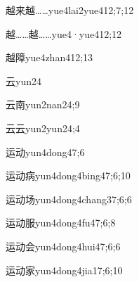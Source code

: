 \begin{verbete}{越来越……}{yue4lai2yue4}{12;7;12}
\end{verbete}

\begin{verbete}{越……越……}{yue4·yue4}{12;12}
\end{verbete}

\begin{verbete}{越障}{yue4zhan4}{12;13}
\end{verbete}

\begin{verbete}{云}{yun2}{4}
\end{verbete}

\begin{verbete}{云南}{yun2nan2}{4;9}
\end{verbete}

\begin{verbete}{云云}{yun2yun2}{4;4}
\end{verbete}

\begin{verbete}{运动}{yun4dong4}{7;6}
\end{verbete}

\begin{verbete}{运动病}{yun4dong4bing4}{7;6;10}
\end{verbete}

\begin{verbete}{运动场}{yun4dong4chang3}{7;6;6}
\end{verbete}

\begin{verbete}{运动服}{yun4dong4fu4}{7;6;8}
\end{verbete}

\begin{verbete}{运动会}{yun4dong4hui4}{7;6;6}
\end{verbete}

\begin{verbete}{运动家}{yun4dong4jia1}{7;6;10}
\end{verbete}

